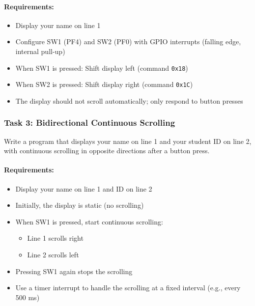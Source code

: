 \paragraph{Requirements:}
\begin{itemize}[nosep]
  \item Display your name on line 1
  \item Configure SW1 (PF4) and SW2 (PF0) with GPIO interrupts (falling edge, internal pull-up)
  \item When SW1 is pressed: Shift display left (command \texttt{0x18})
  \item When SW2 is pressed: Shift display right (command \texttt{0x1C})
  \item The display should not scroll automatically; only respond to button presses
\end{itemize}


\subsubsection{Task 3: Bidirectional Continuous Scrolling}

Write a program that displays your name on line 1 and your student ID on line 2, with continuous scrolling in opposite directions after a button press.

\paragraph{Requirements:}
\begin{itemize}[nosep]
  \item Display your name on line 1 and ID on line 2
  \item Initially, the display is static (no scrolling)
  \item When SW1 is pressed, start continuous scrolling:
    \begin{itemize}[nosep]
      \item Line 1 scrolls right
      \item Line 2 scrolls left
    \end{itemize}
  \item Pressing SW1 again stops the scrolling
  \item Use a timer interrupt to handle the scrolling at a fixed interval (e.g., every 500 ms)
\end{itemize}

  